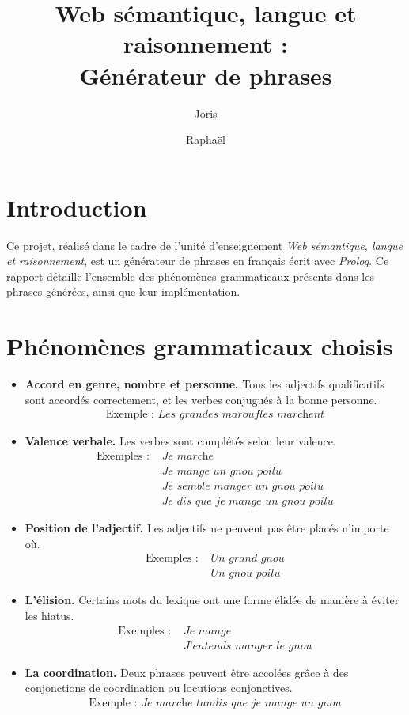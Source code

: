 \documentclass[a4paper,10pt]{article}
\title{
	\textbf{Web sémantique, langue et raisonnement :\\
          Générateur de phrases} }
\author{
	Joris \Nom{Pablo} \and Raphaël \Nom{Gaudy} }
\newcommand\Terme\textit
\begin{document}
\maketitle

\section*{Introduction}
Ce projet, réalisé dans le cadre de l'unité d'enseignement \Terme{Web sémantique, langue et raisonnement}, est un générateur de phrases en français écrit avec \Terme{Prolog}. Ce rapport détaille l'ensemble des phénomènes grammaticaux présents dans les phrases générées, ainsi que leur implémentation.

\section{Phénomènes grammaticaux choisis}
\begin{itemize}
\item \textbf{Accord en genre, nombre et personne.} Tous les adjectifs qualificatifs sont accordés correctement, et les verbes conjugués à la bonne personne. 
  \begin{align*}
    \text{Exemple :~} \textit{Les grandes maroufles marchent}
  \end{align*}

\item \textbf{Valence verbale.} Les verbes sont complétés selon leur valence. 
  \begin{align*}
    \text{Exemples :~} 
    &\textit{Je marche}\\
    &\textit{Je mange un gnou poilu}\\
    &\textit{Je semble manger un gnou poilu}\\
    &\textit{Je dis que je mange un gnou poilu}
  \end{align*}

\item \textbf{Position de l'adjectif.} Les adjectifs ne peuvent pas être placés n'importe où.
  \begin{align*}
    \text{Exemples :~}
    &\textit{Un grand gnou}\\
    &\textit{Un gnou poilu}
  \end{align*}

\item \textbf{L'élision.} Certains mots du lexique ont une forme élidée de manière à éviter les hiatus.
\begin{align*}
  \text{Exemples :~}
  &\textit{Je mange}\\
  &\textit{J'entends manger le gnou}
\end{align*}

\item \textbf{La coordination.} Deux phrases peuvent être accolées grâce à des conjonctions de coordination ou locutions conjonctives.
\begin{align*}
\text{Exemple :~}
\textit{Je marche tandis que je mange un gnou}
\end{align*}
\end{itemize}
\end{document}
